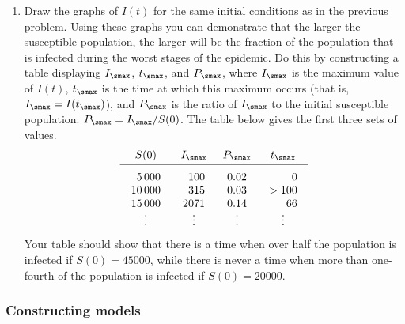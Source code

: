 \begin{enumerate}
\item Draw the graphs of $I(t)$ for the same initial conditions as in
the previous problem.  Using these graphs you can demonstrate that the
larger the susceptible population, the larger will be the fraction of
the population that is infected during the worst stages of the
epidemic.  Do this by constructing a table displaying $I_{\smax}$,
$t_{\smax}$, and $P_{\smax}$, where $I_{\smax}$ is the maximum value
of $I(t)$, $t_{\smax}$ is the time at which this maximum occurs (that
is, $I_{\smax} = I(t_{\smax})$), and $P_{\smax}$ is the ratio of
$I_{\smax}$ to the initial susceptible population:
$P_{\smax}=I_{\smax}/S(0)$.  The table below gives the first three
sets of values.  \addtolength{\arraycolsep}{3pt}
	\[
\begin{array}{cccc}
	S(0) & I_{\smax} & P_{\smax} & t_{\smax} \\[2pt] \hline
	\begin{array}{r}
	\rule{0pt}{14pt} 5\,000 \\ 10\,000 \\ 15\,000 
	\end{array}
	&
	\begin{array}{r}
	\rule{0pt}{14pt} 100 \\ 315 \\ 2071 
	\end{array}
	&
	\begin{array}{r}
	\rule{0pt}{14pt} 0.02 \\ 0.03 \\ 0.14 
	\end{array}
	&
	\begin{array}{r}
	\rule{0pt}{14pt} 0 \\ >100 \\ 66 
	\end{array}
	\\[-2pt]
	\vdots & \vdots & \vdots & \vdots 
\end{array}
\] 
\addtolength{\arraycolsep}{-3pt}%
Your table should show that there is a time when over half the
population is infected if $S(0) = 45000$, while there is never a time
when more than one-fourth of the population is infected if $S(0) =
20000$.


\end{enumerate}
\subsubsection{Constructing models}
\label{subsubsec:constructing-models}

